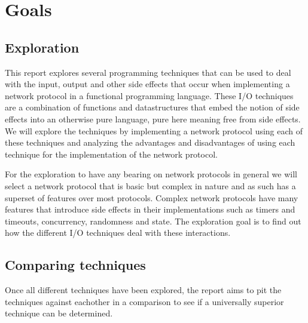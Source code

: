 \chapter{Goals}
\section{Exploration}
This report explores several programming techniques that can be used to deal with the input, output and other side effects that occur when implementing a network protocol in a functional programming language.
These I/O techniques are a combination of functions and datastructures that embed the notion of side effects into an otherwise pure language, pure here meaning free from side effects.
We will explore the techniques by implementing a network protocol using each of these techniques and analyzing the advantages and disadvantages of using each technique for the implementation of the network protocol.

For the exploration to have any bearing on network protocols in general we will select a network protocol that is basic but complex in nature and as such has a superset of features over most protocols. 
Complex network protocols have many features that introduce side effects in their implementations such as timers and timeouts, concurrency, randomness and state.
The exploration goal is to find out how the different I/O techniques deal with these interactions.

\section{Comparing techniques}
Once all different techniques have been explored, the report aims to pit the techniques against eachother in a comparison to see if a universally superior technique can be determined.
